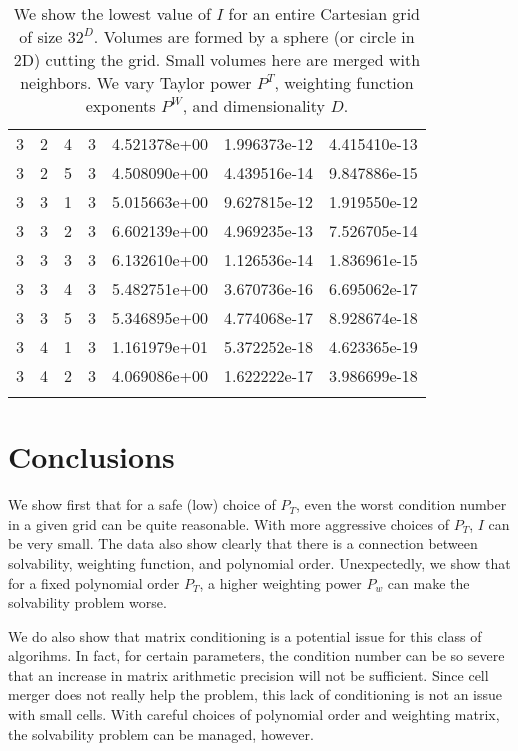 \documentclass{article}
\begin{document}
\begin{table}
\begin{center}
\begin{tabular}{|cccc|ccc|}
3 & 2 & 4 & 3 & 4.521378e+00 & 1.996373e-12 & 4.415410e-13 \\ 
3 & 2 & 5 & 3 & 4.508090e+00 & 4.439516e-14 & 9.847886e-15 \\ 
3 & 3 & 1 & 3 & 5.015663e+00 & 9.627815e-12 & 1.919550e-12 \\ 
3 & 3 & 2 & 3 & 6.602139e+00 & 4.969235e-13 & 7.526705e-14 \\ 
3 & 3 & 3 & 3 & 6.132610e+00 & 1.126536e-14 & 1.836961e-15 \\ 
3 & 3 & 4 & 3 & 5.482751e+00 & 3.670736e-16 & 6.695062e-17 \\ 
3 & 3 & 5 & 3 & 5.346895e+00 & 4.774068e-17 & 8.928674e-18 \\ 
3 & 4 & 1 & 3 & 1.161979e+01 & 5.372252e-18 & 4.623365e-19 \\ 
3 & 4 & 2 & 3 & 4.069086e+00 & 1.622222e-17 & 3.986699e-18 \\ 
\hline
\label{tab::worst_merged_inv_conv}
\end{tabular}
\end{center}
\caption
    {
      We show the lowest value of
      $I$ for an entire Cartesian grid of size $32^D$.
      Volumes are  formed by a sphere (or circle in 2D) cutting the
      grid.   Small volumes here are merged with neighbors.
      We vary Taylor power $P^T$, weighting
      function exponents $P^W$, and dimensionality $D$. 
    }
\end{table}


\section{Conclusions}

We show first that for a safe (low) choice of
$P_T$, even the worst condition number in a given grid can be quite
reasonable. With more aggressive choices of $P_T$, $I$ can be very
small.  The data also
show clearly that there is a connection between solvability, weighting
function, and polynomial order.  Unexpectedly, we show that for a
fixed polynomial order $P_T$, a higher weighting power $P_w$ can make the
solvability problem worse.

We do also show that matrix conditioning is a  potential issue for
this class of algorihms.   In fact, for certain parameters,
the condition number  can be so severe that an
increase in matrix arithmetic precision will not be sufficient.
Since cell merger does not really help the
problem, this lack of conditioning is not an issue with small cells.
With careful choices of polynomial order and weighting matrix, the
solvability problem can be managed, however.
\end{document}
